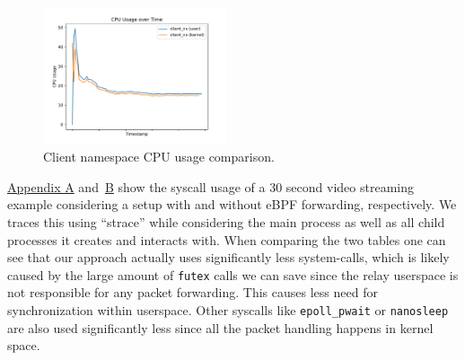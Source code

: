 \begin{figure}[H]
\begin{minipage}{0.48\textwidth}
    \end{minipage}\hfill
    \begin{minipage}{\textwidth}
        \centering
        \includegraphics[width=0.48\textwidth]{figures/04_testing_and_results/cpu_usage_client_ns.pdf}
        \caption[Client CPU usage comparison]{Client namespace CPU usage comparison.}\label{fig:cpu-utilization-client}
    \end{minipage}
\end{figure}



\hyperref[chap:appendix-fast-relay]{Appendix A} and~\hyperref[chap:appendix-plain-relay]{B} show 
the syscall usage of a 30 second video streaming example considering a setup with and without eBPF 
forwarding, respectively.
We traces this using ``strace'' while considering the main process as well as all child processes
it creates and interacts with.
When comparing the two tables one can see that our approach actually uses significantly less system-calls, 
which is likely caused by the large amount of \verb|futex| calls we can save since the relay userspace is not 
responsible for any packet forwarding.
This causes less need for synchronization within userspace.
Other syscalls like \verb|epoll_pwait| or \verb|nanosleep| are also used significantly less since all the 
packet handling happens in kernel space.

